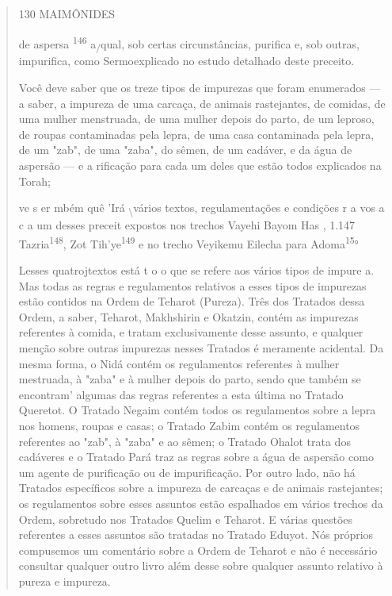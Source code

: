 \begin{quote}
130 MAIMÔNIDES

de aspersa \textsuperscript{146} a\textsubscript{/}qual, sob certas
circunstâncias, purifica e, sob outras, impuri­fica, como Sermoexplicado
no estudo detalhado deste preceito.

Você deve saber que os treze tipos de impurezas que foram enume­rados
--- a saber, a impureza de uma carcaça, de animais rastejantes, de
comi­das, de uma mulher menstruada, de uma mulher depois do parto, de um
lepro­so, de roupas contaminadas pela lepra, de uma casa contaminada
pela lepra, de um "zab", de uma "zaba", do sêmen, de um cadáver, e da
água de aspersão --- e a rificação para cada um deles que estão todos
explicados na Torah;

ve s er mbém quê 'Irá \textsubscript{\textbackslash{}}vários textos,
regulamentações e condições r a vos a c a um desses preceit expostos nos
trechos Vayehi Bayom Has , 1.147\\
Tazria\textsuperscript{148}, Zot Tih'ye\textsuperscript{149} e no trecho
Veyikemu Eilecha para Adoma\textsuperscript{15}°

Les­ses quatrojtextos está t o o que se refere aos vários tipos de
impure a. Mas todas as regras e regulamentos relativos a esses tipos de
impurezas estão conti­dos na Ordem de Teharot (Pureza). Três dos
Tratados dessa Ordem, a saber, Teharot, Makhshirin e Okatzin, contém as
impurezas referentes à comida, e tra­tam exclusivamente desse assunto, e
qualquer menção sobre outras impurezas nesses Tratados é meramente
acidental. Da mesma forma, o Nidá contém os regulamentos referentes à
mulher mestruada, à "zaba" e à mulher depois do parto, sendo que também
se encontram' algumas das regras referentes a esta úl­tima no Tratado
Queretot. O Tratado Negaim contém todos os regulamentos sobre a lepra
nos homens, roupas e casas; o Tratado Zabim contém os regula­mentos
referentes ao "zab", à "zaba" e ao sêmen; o Tratado Ohalot trata dos
cadáveres e o Tratado Pará traz as regras sobre a água de aspersão como
um agente de purificação ou de impurificação. Por outro lado, não há
Tratados es­pecíficos sobre a impureza de carcaças e de animais
rastejantes; os regulamen­tos sobre esses assuntos estão espalhados em
vários trechos da Ordem, sobre­tudo nos Tratados Quelim e Teharot. E
várias questões referentes a esses as­suntos são tratadas no Tratado
Eduyot. Nós próprios compusemos um comen­tário sobre a Ordem de Teharot
e não é necessário consultar qualquer outro livro além desse sobre
qualquer assunto relativo à pureza e impureza.


\end{quote}

